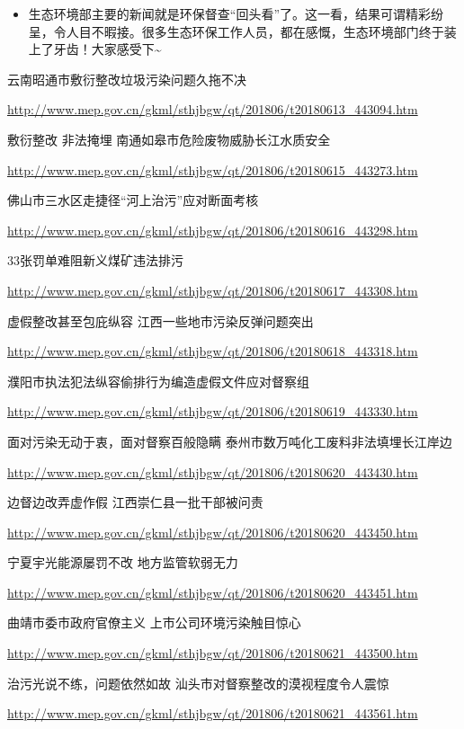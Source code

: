 \documentclass[]{book}
\providecommand{\tightlist}{%
  \setlength{\itemsep}{0pt}\setlength{\parskip}{0pt}}
\begin{document}
\begin{itemize}
\tightlist
\item
  生态环境部主要的新闻就是环保督查``回头看''了。这一看，结果可谓精彩纷呈，令人目不暇接。很多生态环保工作人员，都在感慨，生态环境部门终于装上了牙齿！大家感受下\textasciitilde{}
\end{itemize}

云南昭通市敷衍整改垃圾污染问题久拖不决

\url{http://www.mep.gov.cn/gkml/sthjbgw/qt/201806/t20180613_443094.htm}

敷衍整改 非法掩埋 南通如皋市危险废物威胁长江水质安全

\url{http://www.mep.gov.cn/gkml/sthjbgw/qt/201806/t20180615_443273.htm}

佛山市三水区走捷径``河上治污''应对断面考核

\url{http://www.mep.gov.cn/gkml/sthjbgw/qt/201806/t20180616_443298.htm}

33张罚单难阻新义煤矿违法排污

\url{http://www.mep.gov.cn/gkml/sthjbgw/qt/201806/t20180617_443308.htm}

虚假整改甚至包庇纵容 江西一些地市污染反弹问题突出

\url{http://www.mep.gov.cn/gkml/sthjbgw/qt/201806/t20180618_443318.htm}

濮阳市执法犯法纵容偷排行为编造虚假文件应对督察组

\url{http://www.mep.gov.cn/gkml/sthjbgw/qt/201806/t20180619_443330.htm}

面对污染无动于衷，面对督察百般隐瞒 泰州市数万吨化工废料非法填埋长江岸边

\url{http://www.mep.gov.cn/gkml/sthjbgw/qt/201806/t20180620_443430.htm}

边督边改弄虚作假 江西崇仁县一批干部被问责

\url{http://www.mep.gov.cn/gkml/sthjbgw/qt/201806/t20180620_443450.htm}

宁夏宇光能源屡罚不改 地方监管软弱无力

\url{http://www.mep.gov.cn/gkml/sthjbgw/qt/201806/t20180620_443451.htm}

曲靖市委市政府官僚主义 上市公司环境污染触目惊心

\url{http://www.mep.gov.cn/gkml/sthjbgw/qt/201806/t20180621_443500.htm}

治污光说不练，问题依然如故 汕头市对督察整改的漠视程度令人震惊

\url{http://www.mep.gov.cn/gkml/sthjbgw/qt/201806/t20180621_443561.htm}
\end{document}
